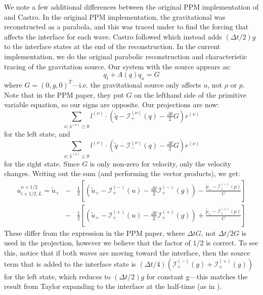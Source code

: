 \documentclass[12pt,preprint]{aastex}
\newcommand{\evm}{{(-)}}
\newcommand{\evp}{{(+)}}
\newcommand{\enu}{{(\nu)}}
\begin{document}
We note a few additional differences between the original PPM
implementation of \citet{ppm} and Castro.  In the original PPM
implementation, the gravitational was reconstructed as a parabola, and
this was traced under to find the forcing that affects the interface
for each wave.  Castro followed \citet{ppmunsplit} which instead adds
$(\Delta t/2)g$ to the interface states at the end of the
reconstruction.  In the current implementation, we do the original
parabolic reconstruction and characteristic tracing of the gravitation
source.  Our system with the source appears as:
\begin{equation}
q_t + A(q) q_x = G
\end{equation}
where $G = (0, g, 0)^T$---i.e. the gravitational source only affects
$u$, not $\rho$ or $p$.  Note that in the PPM paper, they put $G$ on 
the lefthand side of the primitive variable equation, so our signs are
opposite.  Our projections are now:
\begin{equation}
\sum_{\nu; \lambda^\enu \ge 0}l^\enu \cdot (\tilde{q} - \mathcal{I}^\enu_+(q) - \tfrac{\Delta t}{2} G) r^\enu
\end{equation}
for the left state, and
\begin{equation}
\sum_{\nu; \lambda^\enu \le 0} l^\enu \cdot (\tilde{q} - \mathcal{I}^\enu_-(q) - \tfrac{\Delta t}{2} G) r^\enu 
\end{equation}
for the right state.  Since $G$ is only non-zero for velocity, only
the velocity changes.  Writing out the sum (and performing the vector products), we
get:
\begin{eqnarray}
u_{i+1/2,L}^{n+1/2} =
   \tilde{u}_+ 
  &-& \frac{1}{2} \left [
      \left (\tilde{u}_+ - \mathcal{I}_+^\evm(u) - \frac{\Delta t}{2} \mathcal{I}^\evm_+(g) \right ) - 
       \frac{\tilde{p}_+ - \mathcal{I}_+^\evm(p)}{C} \right ] \nonumber \\
  &-& \frac{1}{2} \left [
      \left (\tilde{u}_+ - \mathcal{I}_+^\evp(u) - \frac{\Delta t}{2} \mathcal{I}^\evp_+(g) \right ) +
       \frac{\tilde{p}_+ - \mathcal{I}_+^\evp(p)}{C} \right ]
\end{eqnarray}
These differ from the expression in the PPM paper, where $\Delta t G$,
not $\Delta t/2 G$ is used in the projection, however we believe that
the factor of $1/2$ is correct.  To see this, notice that if both
waves are moving toward the interface, then the source term that is
added to the interface state is $(\Delta t/4) (\mathcal{I}_+^\evm(g) +
\mathcal{I}_+^\evp(g))$ for the left state, which reduces to $(\Delta
t/2) g$ for constant g---this matches the result from Taylor
expanding to the interface at the half-time (as in \citealt{ppmunsplit}).
\end{document}

